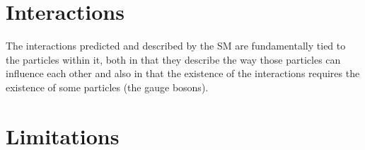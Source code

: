 
\section{Interactions}
\label{sec:interactions}

The interactions predicted and described by the \ac{SM} are fundamentally tied to the particles within it, both in that they describe the way those particles can influence each other and also in that the existence of the interactions requires the existence of some particles (the gauge bosons). 


\section{Limitations}
\label{sec:limitations}

